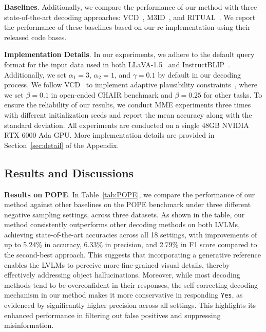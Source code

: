 

\textbf{Baselines}.  Additionally, we compare the performance of our method with three state-of-the-art decoding approaches: VCD~\citep{leng2024mitigating}, M3ID~\citep{favero2024multi}, and RITUAL~\citep{woo2024ritual}.  We report the performance of these baselines based on our re-implementation using their released code bases.

\textbf{Implementation Details}. In our experiments, we adhere to the default query format for the input data used in both LLaVA-1.5~\citep{liu2024improved} and InstructBLIP~\citep{dai2024instructblip}. Additionally, we set $\alpha_1 = 3$, $\alpha_2 = 1$, and $\gamma = 0.1$ by default in our decoding process. We follow VCD~\citep{leng2024mitigating} to implement adaptive plausibility constraints~\citep{li2023contrastive}, where we set $\beta=0.1$ in open-ended CHAIR benchmark and $\beta=0.25$ for other tasks.
To ensure the reliability of our results, we conduct MME experiments three times with different initialization seeds and report the mean accuracy along with the standard deviation. All experiments are conducted on a single 48GB NVIDIA RTX 6000 Ada GPU. More implementation details are provided in Section~\ref{sec:detail} of the Appendix.




\subsection{Results and Discussions}
\textbf{Results on POPE}. In Table~\ref{tab:POPE}, we compare the performance of our method against other baselines on the POPE benchmark under three different negative sampling settings, across three datasets. 
As shown in the table, our method consistently outperforms other decoding methods on both LVLMs, achieving state-of-the-art accuracies across all 18 settings, with improvements of up to 5.24\% in accuracy, 6.33\% in precision, and 2.79\% in F1 score compared to the second-best approach. This suggests that incorporating a generative reference enables the LVLMs to perceive more fine-grained visual details, thereby effectively addressing object hallucinations. Moreover, while most decoding methods tend to be overconfident in their responses, the self-correcting decoding mechanism in our method makes it more conservative in responding \texttt{Yes}, as evidenced by significantly higher precision across all settings. This highlights its enhanced performance in filtering out false positives and suppressing misinformation.

